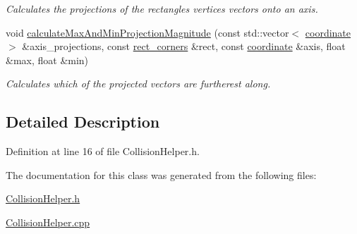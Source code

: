 \begin{DoxyCompactItemize}
\begin{DoxyCompactList}\small\item\em Calculates the projections of the rectangles vertices vectors onto an axis. \end{DoxyCompactList}\item 
\hypertarget{class_collision_helper_a21281c78132a190fb6d8a747a5979d7b}{void \hyperlink{class_collision_helper_a21281c78132a190fb6d8a747a5979d7b}{calculate\+Max\+And\+Min\+Projection\+Magnitude} (const std\+::vector$<$ \hyperlink{structcoordinate}{coordinate} $>$ \&axis\+\_\+projections, const \hyperlink{structrect__corners}{rect\+\_\+corners} \&rect, const \hyperlink{structcoordinate}{coordinate} \&axis, float \&max, float \&min)}\label{class_collision_helper_a21281c78132a190fb6d8a747a5979d7b}

\begin{DoxyCompactList}\small\item\em Calculates which of the projected vectors are furtherest along. \end{DoxyCompactList}\end{DoxyCompactItemize}


\subsection{Detailed Description}


Definition at line 16 of file Collision\+Helper.\+h.



The documentation for this class was generated from the following files\+:\begin{DoxyCompactItemize}
\item 
\hyperlink{_collision_helper_8h}{Collision\+Helper.\+h}\item 
\hyperlink{_collision_helper_8cpp}{Collision\+Helper.\+cpp}\end{DoxyCompactItemize}
